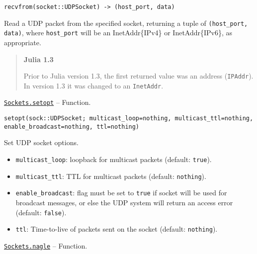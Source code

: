 \begin{adjustwidth}{2em}{0pt}


\begin{verbatim}
recvfrom(socket::UDPSocket) -> (host_port, data)
\end{verbatim}

Read a UDP packet from the specified socket, returning a tuple of \texttt{(host\_port, data)}, where \texttt{host\_port} will be an InetAddr\{IPv4\} or InetAddr\{IPv6\}, as appropriate.

\begin{quote}
\textbf{Julia 1.3}

Prior to Julia version 1.3, the first returned value was an address (\texttt{IPAddr}). In version 1.3 it was changed to an \texttt{InetAddr}.

\end{quote}


\end{adjustwidth}
\hypertarget{16113505891345104473}{}
\hyperlink{16113505891345104473}{\texttt{Sockets.setopt}}  -- {Function.}

\begin{adjustwidth}{2em}{0pt}


\begin{verbatim}
setopt(sock::UDPSocket; multicast_loop=nothing, multicast_ttl=nothing, enable_broadcast=nothing, ttl=nothing)
\end{verbatim}

Set UDP socket options.

\begin{itemize}
\item \texttt{multicast\_loop}: loopback for multicast packets (default: \texttt{true}).


\item \texttt{multicast\_ttl}: TTL for multicast packets (default: \texttt{nothing}).


\item \texttt{enable\_broadcast}: flag must be set to \texttt{true} if socket will be used for broadcast messages, or else the UDP system will return an access error (default: \texttt{false}).


\item \texttt{ttl}: Time-to-live of packets sent on the socket (default: \texttt{nothing}).

\end{itemize}


\end{adjustwidth}
\hypertarget{6421218738057495658}{}
\hyperlink{6421218738057495658}{\texttt{Sockets.nagle}}  -- {Function.}


